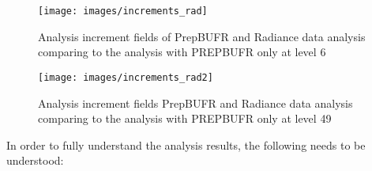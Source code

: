 \begin{figure}[h!]
  \centering
  \texttt{[image: images/increments\_rad]}
  \caption{Analysis increment fields of PrepBUFR and Radiance data analysis comparing to the analysis with PREPBUFR only at level 6}
  \label{fig:increments_rad}
\end{figure}

\begin{figure}[h!]
  \centering
  \texttt{[image: images/increments\_rad2]}
  \caption{Analysis increment fields PrepBUFR and Radiance data analysis comparing to the analysis with PREPBUFR only at level 49}
  \label{fig:increments_rad2}
\end{figure}

In order to fully understand the analysis results, the following needs to be understood:

